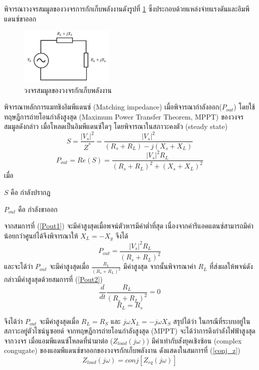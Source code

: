 \documentclass[11pt,a4paper]{article}
\begin{document}
พิจารณาวงจรสมมูลของวงจรการกักเก็บพลังงานดังรูปที่ \ref{genpath_elec_cir} ซึ่งประกอบด้วยแหล่งจ่ายแรงดันและอิมพีแดนซ์ขาออก
\begin{figure}[H]
    \begin{center}
        \includegraphics[width=0.4\textwidth]{genpath_elec_cir.jpg}
    \end{center}
    \caption{วงจรสมมูลของวงจรกักเก็บพลังงาน \cite{MPPT}}
    \label{genpath_elec_cir}
\end{figure}
พิจารณาหลักการแมทชิงอิมพีแดนซ์ (Matching impedance) เมื่อพิจารณากำลังออก($P_{out}$) โดยใช้ทฤษฎีการถ่ายโอนกำลังสูงสุด (Maximum Power Transfer Theorem, MPPT) ของวงจรสมมูลดังกล่าว เมื่อโหลดเป็นอิมพีแดนซ์ใดๆ โดยพิจารณาในสภาวะคงตัว (steady state)
\begin{equation}
    S = \frac{|V_{s}|^2 }{ Z^{*} } = \frac{|V_{s}|^2 }{ (R_{s} + R_{L}) - j(X_{s} + X_{L} )  }
\end{equation}
\begin{equation}\label{Pout1}
    P_{out} = Re(S) = \frac{|V_{s}|^2 R_{L} }{ (R_{s} + R_{L})^2 + (X_{s} + X_{L} )^2  }
\end{equation}
เมื่อ

$S$ คือ กำลังปรากฎ

$P_{out}$ คือ กำลังขาออก

จากสมการที่ ({\ref{Pout1}}) จะมีค่าสูงสุดเมื่อพจน์ตัวหารมีค่าต่ำที่สุด เนื่องจากค่ารีแอคแตนซ์สามารถมีค่าน้อยกว่าศูนย์ได้จึงพิจารณาให้ $X_{L} = - X_{g}$ จึงได้
\begin{equation}
    P_{out}  = \frac{|V_{s}|^2 R_{L} }{ (R_{s} + R_{L})^2 }
\end{equation}
และจะได้ว่า $P_{out}$ จะมีค่าสูงสุดเมื่อ $\frac{ R_{L} }{ (R_{s} + R_{L})^2 }$ มีค่าสูงสุด จากนั้นพิจารณาค่า $R_{L}$ ที่ส่งผลให้พจน์ดังกล่าวมีค่าสูงสุดด้วยสมการที่ (\ref{Pout2})
\begin{equation}\label{Pout2}
    \frac{d}{dt} \frac{ R_{L} }{ (R_{s} + R_{L})^2 } = 0
\end{equation}
\begin{equation}
    R_{L} = R_{s}
\end{equation}

จึงได้ว่า $P_{out}$ จะมีค่าสูงสุดเมื่อ $R_{L} = R_{S}$ และ $j\omega X_{L} = -j\omega X_{S}$
สรุปได้ว่า ในกรณีที่ระบบอยู่ในสภาวะอยู่ตัวไซน์นูซอยด์ จากทฤษฎีการถ่ายโอนกำลังสูงสุด (MPPT) จะได้ว่าการดึงกำลังไฟฟ้าสูงสุดจากวงจร
เมื่อแอมพีแดนซ์โหลดที่นำมาต่อ ($Z_{load}(j\omega)$) มีค่าเท่ากับสังยุคเชิงซ้อน (complex congugate) ของแอมพีแดนซ์ขาออกของวงจรกักเก็บพลังงาน ดังแสดงในสมการที่ (\ref{conj_z})
\begin{equation} \label{conj_z}
    Z_{load}(j\omega) = conj[Z_{eq}(j\omega)]
\end{equation}
\end{document}
